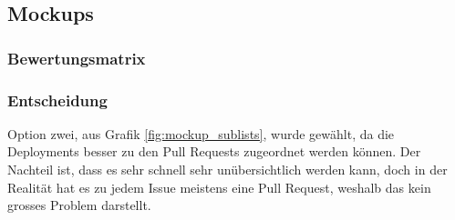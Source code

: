 \begin{minipage}{\textwidth}
    \subsection{Mockups}
    \subsubsection{Bewertungsmatrix}
    \begin{center}
    \end{center}

    \subsubsection{Entscheidung}
    Option zwei, aus Grafik \ref{fig:mockup_sublists}, wurde gewählt, da die Deployments besser zu den Pull Requests
    zugeordnet werden können. Der Nachteil ist, dass es sehr schnell sehr unübersichtlich werden kann, doch in der Realität
    hat es zu jedem Issue meistens eine Pull Request, weshalb das kein grosses Problem darstellt.
\end{minipage}
